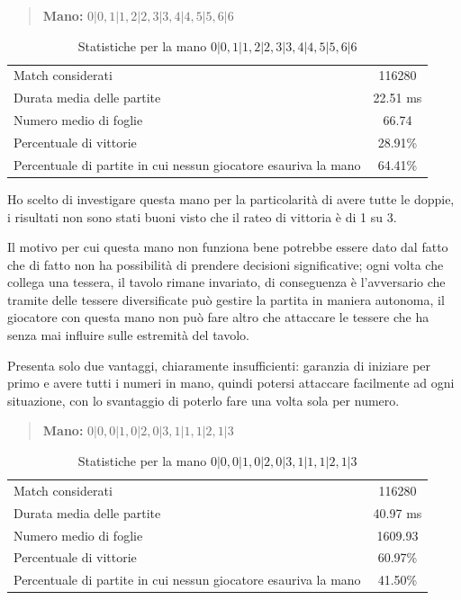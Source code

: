 \documentclass[a4paper,12pt]{report}
\begin{document}
\begin{quote}
    \textbf{Mano:} \(0|0, 1|1, 2|2, 3|3, 4|4, 5|5, 6|6\)
\end{quote}

\begin{table}[h!]
    \centering
    \begin{tabular}{|l|c|}
        \hline
        Match considerati & 116280 \\
        Durata media delle partite & 22.51 ms \\
        Numero medio di foglie & 66.74 \\
        Percentuale di vittorie & 28.91\% \\
        Percentuale di partite in cui nessun giocatore esauriva la mano & 64.41\% \\
        \hline
    \end{tabular}
    \caption{Statistiche per la mano \(0|0, 1|1, 2|2, 3|3, 4|4, 5|5, 6|6\)}
    \label{tab:stats_1}
\end{table}

Ho scelto di investigare questa mano per la particolarità di avere tutte le doppie, i risultati non sono stati buoni visto che il rateo di vittoria è di 1 su 3.

Il motivo per cui questa mano non funziona bene potrebbe essere dato dal fatto che di fatto non ha possibilità di prendere decisioni significative; ogni volta che collega una tessera, il tavolo rimane invariato, di conseguenza è l'avversario che tramite delle tessere diversificate può gestire la partita in maniera autonoma, il giocatore con questa mano non può fare altro che attaccare le tessere che ha senza mai influire sulle estremità del tavolo.

Presenta solo due vantaggi, chiaramente insufficienti: garanzia di iniziare per primo e avere tutti i numeri in mano, quindi potersi attaccare facilmente ad ogni situazione, con lo svantaggio di poterlo fare una volta sola per numero.

\begin{quote}
    \textbf{Mano:} \(0|0, 0|1, 0|2, 0|3, 1|1, 1|2, 1|3\)
\end{quote}

\begin{table}[h!]
    \centering
    \begin{tabular}{|l|c|}
        \hline
        Match considerati & 116280 \\
        Durata media delle partite & 40.97 ms \\
        Numero medio di foglie & 1609.93 \\
        Percentuale di vittorie & 60.97\% \\
        Percentuale di partite in cui nessun giocatore esauriva la mano & 41.50\% \\
        \hline
    \end{tabular}
    \caption{Statistiche per la mano \(0|0, 0|1, 0|2, 0|3, 1|1, 1|2, 1|3\)}
    \label{tab:stats_2}
\end{table}
\end{document}
